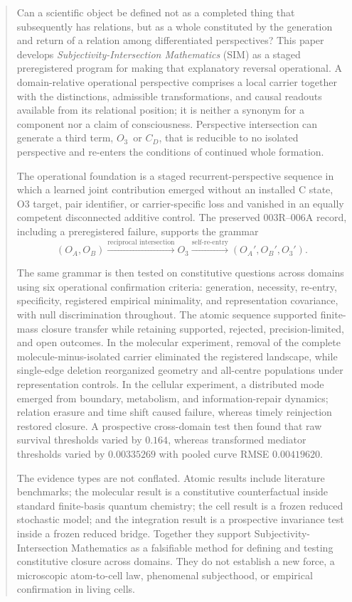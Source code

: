 \documentclass[11pt,a4paper]{article}
\newcommand{\OA}{\ensuremath{O_{A}}}
\newcommand{\OB}{\ensuremath{O_{B}}}
\newcommand{\Othree}{\ensuremath{O_{3}}}
\begin{document}
\begin{abstract}
Can a scientific object be defined not as a completed thing that subsequently has relations, but as a whole constituted by the generation and return of a relation among differentiated perspectives? This paper develops \emph{Subjectivity-Intersection Mathematics} (SIM) as a staged preregistered program for making that explanatory reversal operational. A domain-relative operational perspective comprises a local carrier together with the distinctions, admissible transformations, and causal readouts available from its relational position; it is neither a synonym for a component nor a claim of consciousness. Perspective intersection can generate a third term, \Othree\ or $C_D$, that is reducible to no isolated perspective and re-enters the conditions of continued whole formation.

The operational foundation is a staged recurrent-perspective sequence in which a learned joint contribution emerged without an installed C state, O3 target, pair identifier, or carrier-specific loss and vanished in an equally competent disconnected additive control. The preserved 003R--006A record, including a preregistered failure, supports the grammar
\[
  (\OA,\OB) \xrightarrow{\text{reciprocal intersection}} \Othree
  \xrightarrow{\text{self-re-entry}} (\OA',\OB',\Othree').
\]

The same grammar is then tested on constitutive questions across domains using six operational confirmation criteria: generation, necessity, re-entry, specificity, registered empirical minimality, and representation covariance, with null discrimination throughout. The atomic sequence supported finite-mass closure transfer while retaining supported, rejected, precision-limited, and open outcomes. In the molecular experiment, removal of the complete molecule-minus-isolated carrier eliminated the registered landscape, while single-edge deletion reorganized geometry and all-centre populations under representation controls. In the cellular experiment, a distributed mode emerged from boundary, metabolism, and information-repair dynamics; relation erasure and time shift caused failure, whereas timely reinjection restored closure. A prospective cross-domain test then found that raw survival thresholds varied by $0.164$, whereas transformed mediator thresholds varied by $0.00335269$ with pooled curve RMSE $0.00419620$.

The evidence types are not conflated. Atomic results include literature benchmarks; the molecular result is a constitutive counterfactual inside standard finite-basis quantum chemistry; the cell result is a frozen reduced stochastic model; and the integration result is a prospective invariance test inside a frozen reduced bridge. Together they support Subjectivity-Intersection Mathematics as a falsifiable method for defining and testing constitutive closure across domains. They do not establish a new force, a microscopic atom-to-cell law, phenomenal subjecthood, or empirical confirmation in living cells.
\end{abstract}
\end{document}
